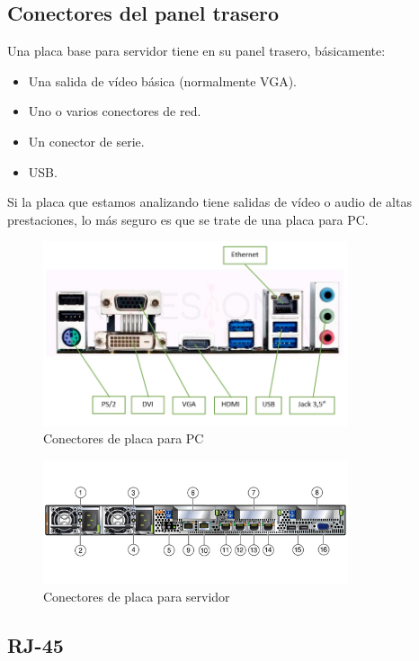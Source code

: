 \documentclass[12pt,spanish]{article}
\begin{document}
\subsection{Conectores del panel trasero}

Una placa base para servidor tiene en su panel trasero, básicamente:

\begin{itemize}
	\item Una salida de vídeo básica (normalmente VGA).
	\item Uno o varios conectores de red.
	\item Un conector de serie.
	\item USB.
\end{itemize}

Si la placa que estamos analizando tiene salidas de vídeo o audio de altas prestaciones, lo más seguro es que se trate de una placa para PC.

\begin{figure}[H]
	\centering
	\includegraphics[width=0.8\textwidth]{pcmobo.jpg}
	\caption{Conectores de placa para PC}
\end{figure}

\begin{figure}[H]
	\centering
	\includegraphics[width=0.8\textwidth]{serverconnectors.jpg}
	\caption{Conectores de placa para servidor}
\end{figure}

\subsection{RJ-45}
\end{document}
